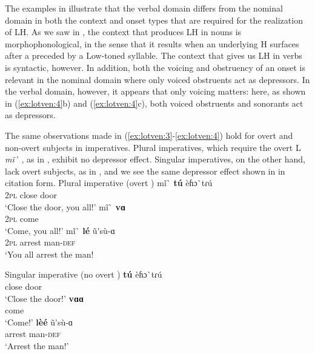 \documentclass[output=paper
,newtxmath
,modfonts
,nonflat]{langsci/langscibook}
\begin{document}
The examples in  illustrate that the verbal domain differs from the nominal domain in both the context and onset types that are required for the realization of LH. As we saw in , the context that produces LH  in nouns is morphophonological, in the sense that it results when an underlying H surfaces after a  preceded by a Low-toned syllable. The context that gives us LH in verbs is syntactic, however. In addition, both the voicing and obstruency of an onset is relevant in the nominal domain where only voiced obstruents act as depressors. In the verbal domain, however, it appears that only voicing matters: here, as shown in (\ref{ex:lotven:4}b) and (\ref{ex:lotven:4}c), both voiced obstruents and sonorants act as depressors.

The same observations made in (\ref{ex:lotven:3}-\ref{ex:lotven:4}) hold for overt and non-overt subjects in imperatives. Plural imperatives, which require the overt L   \textit{mĩ\`{} }, as in , exhibit no depressor effect. Singular imperatives, on the other hand, lack overt subjects, as in , and we see the same depressor effect shown in  in citation form. 
\ea\label{ex:lotven:5} Plural imperative (overt )
\ea\label{ex:lotven:5a}
    \gll mĩ\`{}   \textbf{tú} èɦɔ\`{}tɾú\\
    2\textsc{pl}  close door    \\
    \glt ‘Close the door, you all!’
\ex\label{ex:lotven:5b}
	\gll mĩ\`{}   \textbf{vɑ} \\
    2\textsc{pl} come\\
    \glt ‘Come, you all!’
\ex\label{ex:lotven:5c}
	\gll mĩ\`{}    \textbf{lé}       ũ\'{}sù-ɑ \\
    2\textsc{pl}  arrest man-\textsc{def}\\
    \glt ‘You all arrest the man!
\z
\z
 
\ea\label{ex:lotven:6}Singular imperative (no overt )
\ea\label{ex:lotven:6a}
    \gll \textbf{tú} èɦɔ\`{}tɾú\\
    close door    \\
    \glt ‘Close the door!’
\ex\label{ex:lotven:6b}
	\gll \textbf{vɑɑ}\\
	come\\
    \glt ‘Come!’
\ex\label{ex:lotven:6c}
	\gll \textbf{lèé}     ũ\'{}sù-ɑ\\
    arrest man-\textsc{def}\\
    \glt ‘Arrest the man!’
\z
\z
\end{document}
